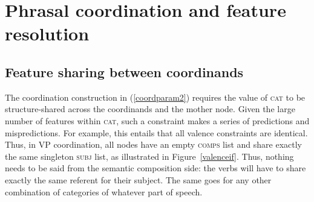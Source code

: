 {\section{Phrasal coordination and feature resolution}

\subsection{Feature sharing between coordinands}

The coordination construction in (\ref{coordparam2}) requires the value of \textsc{cat} to be structure-shared across the coordinands and the mother node. Given the large number of features within \textsc{cat}, such a constraint makes a series of predictions and mispredictions.
For example, this entails that all valence constraints are identical. Thus, in VP coordination, all nodes have an empty \textsc{comps} list and share exactly the same singleton \textsc{subj} list, as illustrated in Figure~\ref{valenceif}. Thus, nothing needs to be said from the semantic composition side: the verbs will have to share exactly the same referent for their subject. The same goes for any other combination of categories of whatever part of speech.




}
